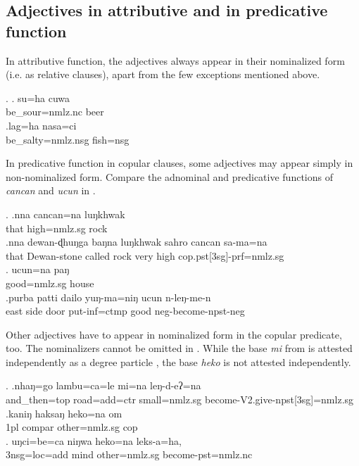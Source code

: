 	
\subsection{Adjectives in attributive and in predicative function}\label{sec-adj-str}

In attributive function, the adjectives always appear in their nominalized form (i.e. as relative clauses), apart from  the few exceptions mentioned above. 

\ex. \ag. su=ha cuwa\\
	be\_sour{\sc =nmlz.nc} beer\\
\bg.lag=ha nasa=ci\\
		be\_salty{\sc =nmlz.nsg} fish{\sc =nsg}	\\
	
In predicative function in copular clauses, some adjectives may appear simply in non-nominalized  form. Compare the adnominal and predicative functions of \emph{cancan}  and  \emph{ucun}  in \Next. 

\ex. \ag.nna   cancan=na luŋkhwak\\
		that high{\sc =nmlz.sg} rock	\\
	 
 	\bg.nna  dewan-ɖhuŋga baŋna luŋkhwak sahro cancan sa-ma=na\\
	that Dewan-stone called rock very high {\sc cop.pst[3sg]-prf=nmlz.sg}	\\
	 
\bg. ucun=na paŋ\\ 
	good{\sc =nmlz.sg} house\\ 
	 \bg.purba patti dailo yuŋ-ma=niŋ  ucun n-leŋ-me-n\\
	east side door put-{\sc inf=ctmp} good {\sc neg-}become{\sc [3sg]-npst-neg}\\
	 
	
Other adjectives have to appear in nominalized form in the copular predicate, too. The nominalizers  cannot  be omitted in \Next. While the base \emph{mi} from \Next[a] is attested independently as a degree particle , the base \emph{heko} is not attested independently.

	\ex. \ag.nhaŋ=go        lambu=ca=le                 mi=na  leŋ-d-eʔ=na\\
	and\_then{\sc =top} road{\sc =add=ctr} small{\sc =nmlz.sg}  become{\sc -V2.give-npst[3sg]=nmlz.sg}\\
	 
	\bg.kaniŋ haksaŋ   heko=na         om\\
	{\sc 1pl} {\sc compar} other{\sc =nmlz.sg} {\sc cop}\\
	 
\bg.  uŋci=be=ca           niŋwa heko=na         leks-a=ha,\\
{\sc 3nsg=loc=add} mind other{\sc =nmlz.sg} become{\sc [3sg]-pst=nmlz.nc}\\
 

